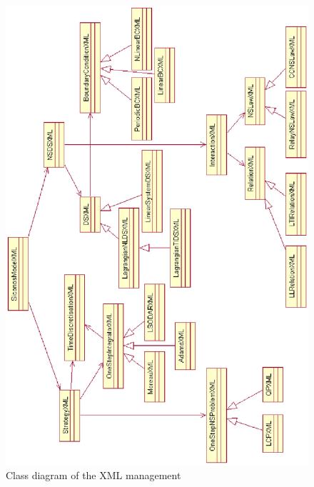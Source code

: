 	\begin{figure}
	\begin{center}
	\includegraphics[scale=0.75, clip]{figure/schemaXML.eps}
	\caption{Class diagram of the XML management}
	\label{fig: Class diagram of the XML management}
	\end{center}
	\end{figure}
	
